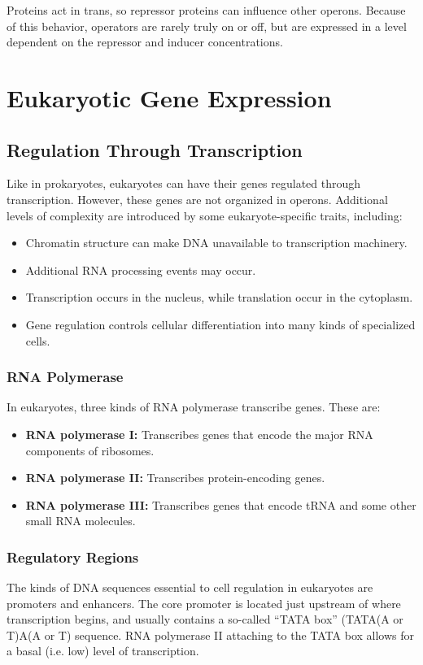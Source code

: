 \documentclass[12pt,titlepage]{article}
\begin{document}
        Proteins act in trans, so repressor proteins can influence other operons. Because of this behavior, operators are rarely truly on or off, but are expressed
        in a level dependent on the repressor and inducer concentrations.

  \newpage

  \section{Eukaryotic Gene Expression}

    \subsection{Regulation Through Transcription}
      Like in prokaryotes, eukaryotes can have their genes regulated through transcription. However, these genes are not organized in operons. Additional levels
      of complexity are introduced by some eukaryote-specific traits, including:
      \begin{itemize}
        \item Chromatin structure can make DNA unavailable to transcription machinery.
        \item Additional RNA processing events may occur.
        \item Transcription occurs in the nucleus, while translation occur in the cytoplasm.
        \item Gene regulation controls cellular differentiation into many kinds of specialized cells.
      \end{itemize}

      \subsubsection{RNA Polymerase}
        In eukaryotes, three kinds of RNA polymerase transcribe genes. These are:
        \begin{itemize}
          \item \textbf{RNA polymerase I:} Transcribes genes that encode the major RNA components of ribosomes.
          \item \textbf{RNA polymerase II:} Transcribes protein-encoding genes.
          \item \textbf{RNA polymerase III:} Transcribes genes that encode tRNA and some other small RNA molecules.
        \end{itemize}

      \subsubsection{Regulatory Regions}
        The kinds of DNA sequences essential to cell regulation in eukaryotes are promoters and enhancers. The core promoter is located just upstream of where
        transcription begins, and usually contains a so-called ``TATA box'' (TATA(A or T)A(A or T) sequence. RNA polymerase II attaching to the TATA box
        allows for a basal (i.e. low) level of transcription.
\end{document}
